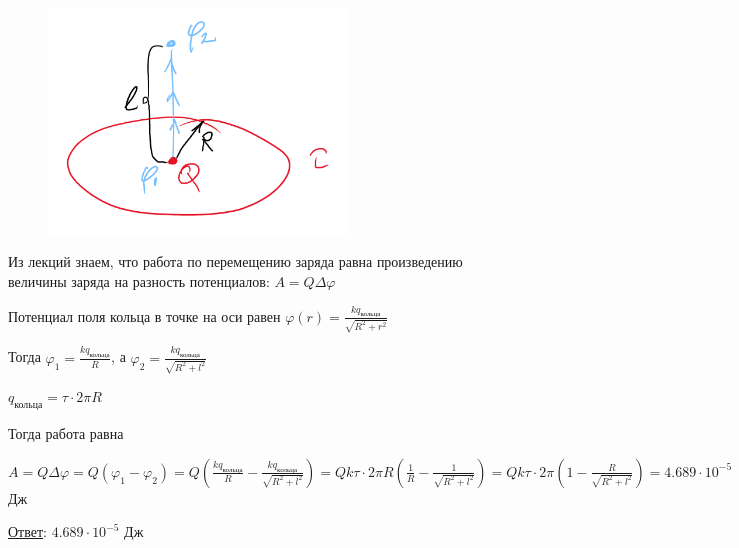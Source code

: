 \documentclass[12pt]{article}
\begin{document}
\begin{minipage}{\textwidth}
    \begin{figure}
        \includegraphics[width=8cm]{physics1/images/physics1_homework_7_3}
    \end{figure}

    Из лекций знаем, что работа по перемещению заряда равна произведению величины заряда на разность потенциалов: 
    $A = Q\Delta\varphi$

    Потенциал поля кольца в точке на оси равен $\varphi(r) = \frac{kq_{\text{кольца}}}{\sqrt{R^2 + r^2}}$

    Тогда $\varphi_1 = \frac{kq_{\text{кольца}}}{R}$, а $\varphi_2 = \frac{kq_{\text{кольца}}}{\sqrt{R^2 + l^2}}$

    $q_{\text{кольца}} = \tau \cdot 2\pi R$

    Тогда работа равна 
    
    $A = Q\Delta \varphi = Q(\varphi_1 - \varphi_2) = 
    Q\left(\frac{kq_{\text{кольца}}}{R} - \frac{kq_{\text{кольца}}}{\sqrt{R^2 + l^2}}\right) = 
    Qk\tau \cdot 2\pi R \left(\frac{1}{R} - \frac{1}{\sqrt{R^2 + l^2}}\right) = 
    Qk\tau \cdot 2\pi \left(1 - \frac{R}{\sqrt{R^2 + l^2}}\right) = 4.689 \cdot 10^{-5}$ Дж

\end{minipage}

\bigvspace

\underline{Ответ}: $4.689 \cdot 10^{-5}$ Дж


\end{document}

